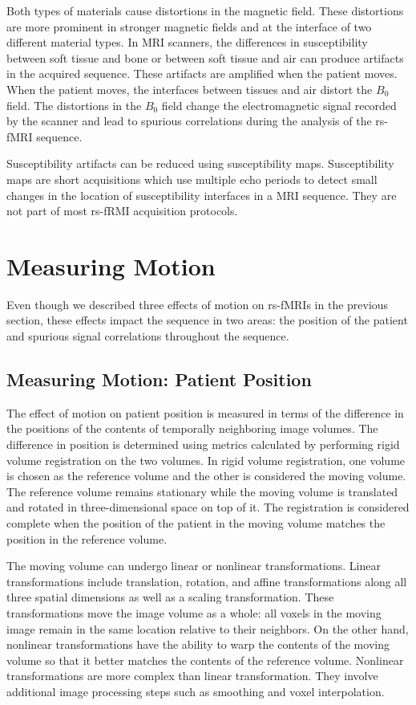 Both types of materials cause distortions in the magnetic field. These distortions are more prominent in stronger magnetic fields and at the interface of two different material types. In MRI scanners, the differences in susceptibility between soft tissue and bone or between soft tissue and air can produce artifacts in the acquired sequence. These artifacts are amplified when the patient moves. When the patient moves, the interfaces between tissues and air distort the $B_0$ field. The distortions in the $B_0$ field change the electromagnetic signal recorded by the scanner and lead to spurious correlations during the analysis of the rs-fMRI sequence.

Susceptibility artifacts can be reduced using susceptibility maps. Susceptibility maps are short acquisitions which use multiple echo periods to detect small changes in the location of susceptibility interfaces in a MRI sequence. They are not part of most rs-fRMI acquisition protocols.

\section{Measuring Motion}

Even though we described three effects of motion on rs-fMRIs in the previous section, these effects impact the sequence in two areas: the position of the patient and spurious signal correlations throughout the sequence.

\subsection{Measuring Motion: Patient Position} 

The effect of motion on patient position is measured in terms of the difference in the positions of the contents of temporally neighboring image volumes. The difference in position is determined using metrics calculated by performing rigid volume registration on the two volumes. 
In rigid volume registration, one volume is chosen as the reference volume and the other is considered the moving volume. The reference volume remains stationary while the moving volume is translated and rotated in three-dimensional space on top of it. The registration is considered complete when the position of the patient in the moving volume matches the position in the reference volume. %

The moving volume can undergo linear or nonlinear transformations. Linear transformations include translation, rotation, and affine transformations along all three spatial dimensions as well as a scaling transformation. These transformations move the image volume as a whole: all voxels in the moving image remain in the same location relative to their neighbors. On the other hand, nonlinear transformations have the ability to warp the contents of the moving volume so that it better matches the contents of the reference volume. Nonlinear transformations are more complex than linear transformation. They involve additional image processing steps such as smoothing and voxel interpolation.

